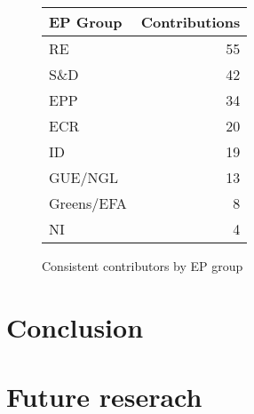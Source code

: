 \documentclass[lettersize,journal]{IEEEtran}
\begin{document}
\begin{figure}[h]
	\begin{center}
		\begin{tabular}{| l | r |}
			\hline
			EP Group & Contributions\\
			\hline
			RE & 55 \\
			S\&D & 42 \\
			EPP & 34 \\	
			ECR & 20 \\
			ID & 19 \\
			GUE/NGL & 13 \\
			Greens/EFA & 8 \\
			NI & 4 \\
			\hline
		\end{tabular}
		\caption{Consistent contributors by EP group}
		\label{epgroup_consistent_contributors}
	\end{center}
\end{figure}




\section{Conclusion} \label{sec:conclusion}


\section{Future reserach} \label{sec:futureresearch}

\end{document}

